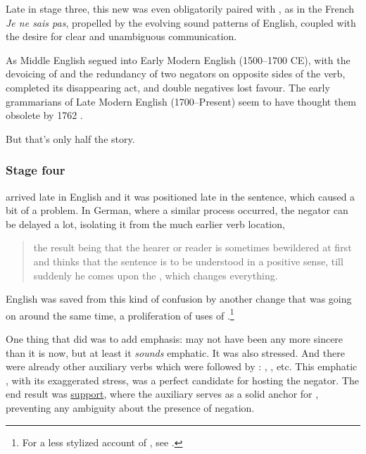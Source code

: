 Late in stage three, this new  was even obligatorily paired with , as in the French \textit{Je \emph{ne} sais \emph{pas}}, propelled by the evolving sound patterns of English, coupled with the desire for clear and unambiguous communication.

As Middle English segued into Early Modern English (1500--1700 CE), with the devoicing of  and the redundancy of two negators on opposite sides of the verb,  completed its disappearing act, and double negatives lost favour. The early grammarians of Late Modern English (1700--Present) seem to have thought them obsolete by 1762 \citep[365]{Gilman1989}.

But that's only half the story.

\subsubsection*{Stage four}

 arrived late in English and it was positioned late in the sentence, which caused a bit of a problem. In German, where a similar process occurred, the negator  can be delayed a lot, isolating it from the much earlier verb location,

\begin{quote}
    the result being that the hearer or reader is sometimes bewildered at first and thinks that the sentence is to be understood in a positive sense, till suddenly he comes upon the , which changes everything. \\ \citep[10]{Jespersen1917}
\end{quote}

English was saved from this kind of confusion by another change that was going on around the same time, a proliferation of uses of .\footnote{For a less stylized account of , see \citet{Denison1985}.}

One thing that  did was to add emphasis:  may not have been any more sincere than it is now, but at least it \emph{sounds} emphatic. It was also stressed. And there were already other auxiliary verbs which were followed by : , , etc. This emphatic , with its exaggerated stress, was a perfect candidate for hosting the negator. The end result was \hyperref[sec:basic-do-support]{ support}, where the auxiliary  serves as a solid anchor for , preventing any ambiguity about the presence of negation.

